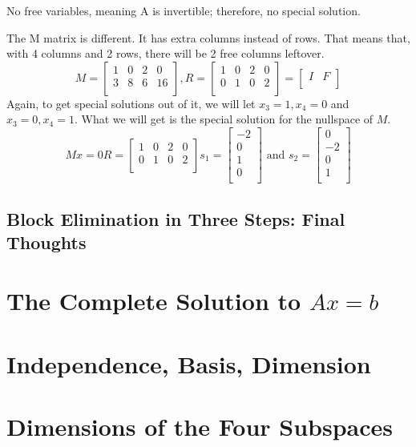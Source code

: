 No free variables, meaning A is invertible; therefore, no special solution. 

The M matrix is different. It has extra columns instead of rows. That means that, with 4 columns and 2 rows, there will be 2 free columns leftover. 
\[
    M = 
    \begin{bmatrix}
        1 & 0 & 2 & 0  \\
        3 & 8 & 6 & 16  \\
    \end{bmatrix}, 
    R = 
    \begin{bmatrix}
        1 & 0 & 2 & 0  \\
        0 & 1 & 0 & 2  \\
    \end{bmatrix}
    = 
    \begin{bmatrix}
        I & F  \\
    \end{bmatrix}
\]
Again, to get special solutions out of it, we will let \(x_3 = 1, x_4 = 0\) and \(x_3 = 0, x_4 = 1\). What we will get is the special solution for the nullspace of \(M\). 
\[
    Mx = 0
    R = 
    \begin{bmatrix}
        1 & 0 & 2 & 0  \\
        0 & 1 & 0 & 2  \\
    \end{bmatrix}
    s_1 = 
    \begin{bmatrix}
        -2 \\
        0 \\
        1\\
        0\\
    \end{bmatrix}
    \text{ and }
    s_2 = 
    \begin{bmatrix}
         0 \\
         -2 \\
         0 \\
         1 \\
    \end{bmatrix}
\]  

\subsection{Block Elimination in Three Steps: Final Thoughts}

\section{The Complete Solution to \(Ax = b\)}


\section{Independence, Basis, Dimension}

\section{Dimensions of the Four Subspaces}

